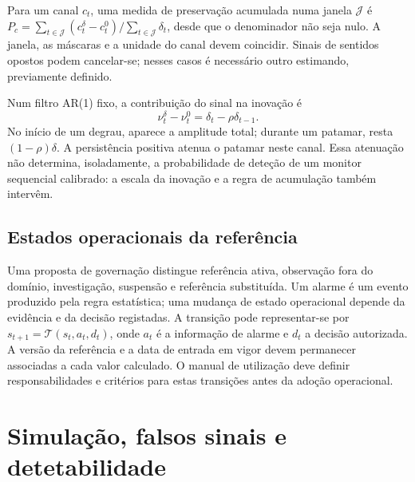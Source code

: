 Para um canal $c_t$, uma medida de preservação acumulada numa janela $\mathcal J$ é $P_c=\sum_{t\in\mathcal J}(c_t^\delta-c_t^0)/\sum_{t\in\mathcal J}\delta_t$, desde que o denominador não seja nulo. A janela, as máscaras e a unidade do canal devem coincidir. Sinais de sentidos opostos podem cancelar-se; nesses casos é necessário outro estimando, previamente definido.

Num filtro AR(1) fixo, a contribuição do sinal na inovação é
\begin{equation}
\nu_t^\delta-\nu_t^0=\delta_t-\rho\delta_{t-1}.
\label{eq:mat-atenuacao-ar}
\end{equation}
No início de um degrau, aparece a amplitude total; durante um patamar, resta $(1-\rho)\delta$. A persistência positiva atenua o patamar neste canal. Essa atenuação não determina, isoladamente, a probabilidade de deteção de um monitor sequencial calibrado: a escala da inovação e a regra de acumulação também intervêm.

\subsection{Estados operacionais da referência}
\label{sec:mat-estados-operacionais}
Uma proposta de governação distingue referência ativa, observação fora do domínio, investigação, suspensão e referência substituída. Um alarme é um evento produzido pela regra estatística; uma mudança de estado operacional depende da evidência e da decisão registadas. A transição pode representar-se por $s_{t+1}=\mathcal T(s_t,a_t,d_t)$, onde $a_t$ é a informação de alarme e $d_t$ a decisão autorizada. A versão da referência e a data de entrada em vigor devem permanecer associadas a cada valor calculado. O manual de utilização deve definir responsabilidades e critérios para estas transições antes da adoção operacional.


\section{Simulação, falsos sinais e detetabilidade}
\label{sec:mat-simulacao}

